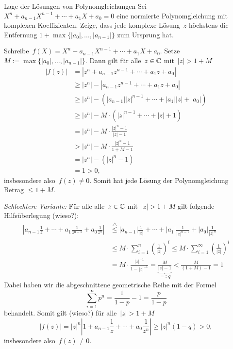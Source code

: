 \documentclass{algblatt}
\begin{document}
\vspace*{-1.5cm}

\begin{aufgabe}{Lage der Lösungen von Polynomgleichungen}
Sei $X^n + a_{n - 1} X^{n - 1} + \cdots + a_1 X + a_0 = 0$ eine normierte
Polynomgleichung mit komplexen Koeffizienten. Zeige, dass jede komplexe
Lösung~$z$ höchstens die Entfernung
$1+\max\{|a_0|,\ldots,|a_{n-1}|\}$ zum Ursprung hat.
\begin{loesung}
Schreibe~$f(X) = X^n + a_{n - 1} X^{n - 1} + \cdots + a_1 X + a_0$.
Setze~$M := \max\{|a_0|,\ldots,|a_{n-1}|\}$. Dann gilt für alle~$z \in \mathbb{C}$
mit~$|z| > 1 + M$
\begin{align*}
  |f(z)| &= |z^n + a_{n-1}z^{n-1} + \cdots + a_1 z + a_0| \\
  &\geq |z^n| - |a_{n-1}z^{n-1} + \cdots + a_1 z + a_0| \\
  &\geq |z^n| - \left(|a_{n-1}| |z|^{n-1} + \cdots + |a_1| |z| + |a_0|\right) \\
  &\geq |z^n| - M \cdot \left(|z|^{n-1} + \cdots + |z| + 1\right) \\
  &= |z^n| - M \cdot \frac{|z|^n-1}{|z|-1} \\
  &> |z^n| - M \cdot \frac{|z|^n-1}{1+M-1} \\
  &= |z^n| - (|z|^n - 1) \\
  &= 1 > 0,
\end{align*}
insbesondere also~$f(z) \neq 0$. Somit hat jede Lösung der Polynomgleichung
Betrag $\leq 1 + M$.

\emph{Schlechtere Variante:}
Für alle alle~$z \in \mathbb{C}$ mit~$|z| > 1 + M$ gilt folgende Hilfsüberlegung (wieso?):
\begin{align*}
  \left|a_{n-1} \frac{1}{z} + \cdots + a_1 \frac{1}{z^{n-1}} + a_0
  \frac{1}{z^n}\right| &\stackrel{\triangle}{\leq}
  |a_{n-1}| \frac{1}{|z|} + \cdots + |a_1| \frac{1}{|z|^{n-1}} + |a_0|
  \frac{1}{|z|^n} \\
  &\leq M \cdot \sum_{i=1}^n \left(\frac{1}{|z|}\right)^i
  \leq M \cdot \sum_{i=1}^\infty \left(\frac{1}{|z|}\right)^i \\
  &= M \cdot \frac{|z|^{-1}}{1 - |z|^{-1}} =
  \underbrace{\frac{M}{|z| - 1}}_{=:\,q} < \frac{M}{(1+M)-1} = 1
\end{align*}
Dabei haben wir die abgeschnittene geometrische Reihe mit der Formel
\[ \sum_{i=1}^\infty p^n = \frac{1}{1 - p} - 1 =
  \frac{p}{1-p} \]
behandelt. Somit gilt (wieso?) für alle~$|z| > 1 + M$
\[ |f(z)| = |z|^n \left|1 + a_{n-1} \frac{1}{z} + \cdots + a_0 \frac{1}{z^n}\right|
  \geq |z|^n \left(1 - q\right) > 0, \]
insbesondere also~$f(z) \neq 0$.


\end{loesung}
\end{aufgabe}
\end{document}
